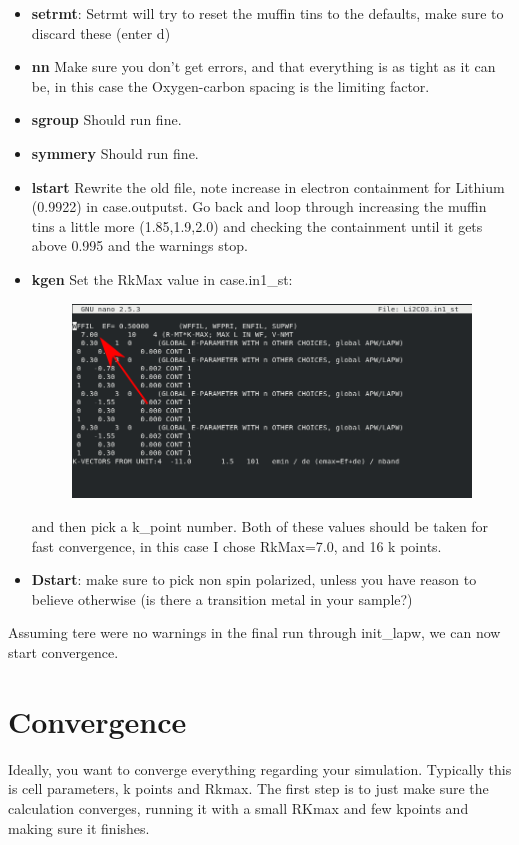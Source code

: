 \documentclass[12pt]{article}
\begin{document}
\begin{itemize}
	\item \textbf{setrmt}: Setrmt will try to reset the muffin tins to the defaults, make sure to discard these (enter d)
	\item \textbf{nn} Make sure you don't get errors, and that everything is as tight as it can be, in this case the Oxygen-carbon spacing is the limiting factor.  
	\item \textbf{sgroup} Should run fine.
	\item  \textbf{symmery} Should run fine. 
	\item \textbf{lstart} Rewrite the old file, note increase in electron containment for Lithium (0.9922) in case.outputst.  Go back and loop through increasing the muffin tins a little more (1.85,1.9,2.0) and checking the containment until it gets above 0.995 and the warnings stop.  
	\item \textbf{kgen} Set the RkMax value in case.in1\_st:		
	\begin{figure}[H]
		\includegraphics[scale=0.4]{./images/init_lapw3.png}
	\end{figure}
	and then pick a k\_point number.  Both of these values should be taken for fast convergence, in this case I chose RkMax=7.0, and 16 k points.
	\item \textbf{Dstart}: make sure to pick non spin polarized, unless you have reason to believe otherwise (is there a transition metal in your sample?)
\end{itemize}

Assuming tere were no warnings in the final run through init\_lapw, we can now start convergence.

\section{Convergence}
Ideally, you want to converge everything regarding your simulation.  Typically this is cell parameters, k points and Rkmax.  The first step is to just make sure the calculation converges, running it with a small RKmax and few kpoints and making sure it finishes.  
\end{document}
